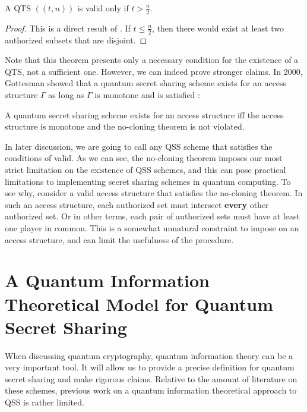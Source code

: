 \begin{corollary}
    \label{cor:qts}
    A QTS $((t,n))$ is valid only if $t > \frac{n}{2}$.
\end{corollary}

\begin{proof}
    This is a direct result of . If $t \leq \frac{n}{2}$, then there would exist at least two authorized subsets that are disjoint. 
\end{proof}

Note that this theorem presents only a necessary condition for the existence of a QTS, not a sufficient one. However, we can indeed prove stronger claims. In 2000, Gottesman showed that a quantum secret sharing scheme exists for an access structure $\Gamma$ as long as $\Gamma$ is monotone and  is satisfied \cite{gottesman_theory_2000}:

\begin{theorem}
    \label{thm:monotone-gamma}
    A quantum secret sharing scheme exists for an access structure iff the access structure is monotone and the no-cloning theorem is not violated.
\end{theorem}

In later discussion, we are going to call any QSS scheme that satisfies the conditions of  valid. As we can see, the no-cloning theorem imposes our most strict limitation on the existence of QSS schemes, and this can pose practical limitations to implementing secret sharing schemes in quantum computing. To see why, consider a valid access structure that satisfies the no-cloning theorem. In such an access structure, each authorized set must intersect \textbf{every} other authorized set. Or in other terms, each pair of authorized sets must have at least one player in common. This is a somewhat unnatural constraint to impose on an access structure, and can limit the usefulness of the procedure.

\section{A Quantum Information Theoretical Model for Quantum Secret Sharing}

When discussing quantum cryptography, quantum information theory can be a very important tool. It will allow us to provide a precise definition for quantum secret sharing and make rigorous claims. Relative to the amount of literature on these schemes, previous work on a quantum information theoretical approach to QSS is rather limited.

